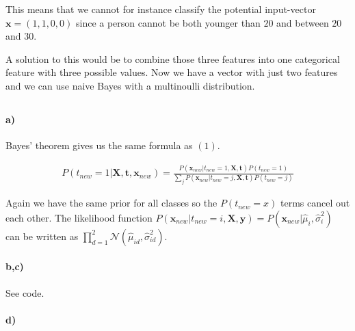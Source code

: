 \documentclass{article}
\begin{document}
This means that we cannot for instance classify the potential input-vector
$\mathbf{x} = (1, 1, 0, 0)$ since a person cannot be both younger than $20$ and
between $20$ and $30$.

A solution to this would be to combine those three features into one
categorical feature with three possible values. Now we have a vector with just
two features and we can use naive Bayes with a multinoulli distribution.

\setcounter{section}{2}
\setcounter{subsection}{0}
\subsection{}

\paragraph{a)}

Bayes' theorem gives us the same formula as $(1)$.

\begin{align}
  P\left( t_{new} = 1 \vert \mathbf{X}, \mathbf{t}, \mathbf{x}_{new} \right)
  = \frac{P \left( \mathbf{x}_{new} \vert t_{new} = 1, \mathbf{X}, \mathbf{t} \right) P \left( t_{new} = 1 \right)}{ \sum_j P \left( \mathbf{x}_{new} \vert t_{new} = j, \mathbf{X}, \mathbf{t} \right) P \left( t_{new} = j \right) }
\end{align}

Again we have the same prior for all classes so the $P(t_{new} = x)$ terms cancel out each other. The likelihood function $P(\mathbf{x}_{new}
\vert t_{new} = i, \mathbf{X}, \mathbf{y}) = P(\mathbf{x}_{new} \vert
\hat{\mu}_i, \hat{\sigma}_i^2)$ can be written as $\prod_{d = 1}^{2}
\mathcal{N}(\hat{\mu}_{id}, \hat{\sigma}^2_{id})$.

\paragraph{b,c)}

See code.

\paragraph{d)}

\subsection{}
\end{document}
